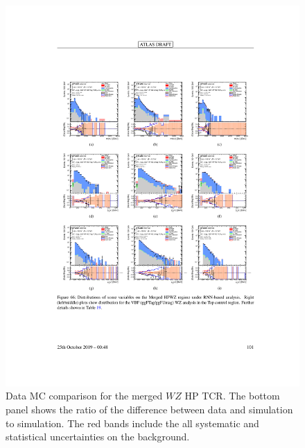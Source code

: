 \begin{figure}[htbp]
  \centering
  \includegraphics{figures/Analysis/datamc/merged_hp_wz_tcr.pdf}
    \caption{Data MC comparison for the merged $WZ$ HP TCR. The bottom panel shows the ratio of the difference between data and simulation to simulation. The red bands include the all systematic and statistical uncertainties on the background. } 
  \label{fig:merged_hp_wz_TCR_datamc}
\end{figure} 
\FloatBarrier


